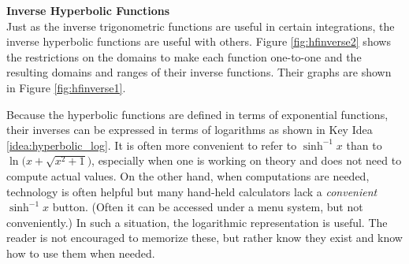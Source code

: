 \noindent\textbf{\large Inverse Hyperbolic Functions}\\

Just as the inverse trigonometric functions are useful in certain integrations, the inverse hyperbolic functions are useful with others. Figure \ref{fig:hfinverse2} shows the restrictions on the domains to make each function one-to-one and the resulting domains and ranges of their inverse functions. Their graphs are shown in Figure \ref{fig:hfinverse1}.

Because the hyperbolic functions are defined in terms of exponential functions, their inverses can be expressed in terms of logarithms as shown in Key Idea \ref{idea:hyperbolic_log}. It is often more convenient to refer to $\sinh^{-1}x$ than to $\ln\big(x+\sqrt{x^2+1}\big)$, especially when one is working on theory and does not need to compute actual values. On the other hand, when computations are needed, technology is often helpful but many hand-held calculators lack a \textit{convenient} $\sinh^{-1}x$ button. (Often it can be accessed under a menu system, but not conveniently.) In such a situation, the logarithmic representation is useful. The reader is not encouraged to memorize these, but rather know they exist and know how to use them when needed.
\clearpage


%


